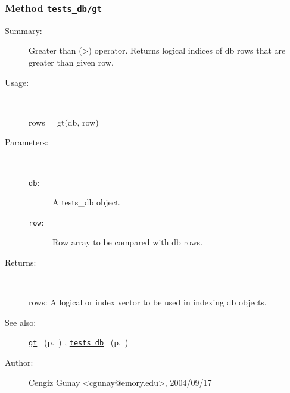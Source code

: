 \subsubsection[Method \texttt{gt}]{Method \texttt{tests\_db/gt}}%
%
\label{ref_tests_db__gt}%
\hypertarget{ref_tests_db__gt}{}%
\begin{description}
\item[Summary:]Greater than (>) operator. Returns logical indices of db rows 
	that are greater than given row.
%
\item[Usage:]~%
\begin{lyxcode}%
rows = gt(db, row)
%
\end{lyxcode}%
%
%
\item[Parameters:]~
\begin{description}%
\item[\texttt{db}:]
 A tests\_db object.
\item[\texttt{row}:]
 Row array to be compared with db rows.
\end{description}%
%
\item[Returns:]~

	rows: A logical or index vector to be used in indexing db objects. 
%
%
\item[See also:]%
\hyperlink{ref_gt}{\texttt{gt}}%
\ (p.~\pageref{ref_gt})%
%
, \hyperlink{ref_tests_db}{\texttt{tests\_db}}%
\ (p.~\pageref{ref_tests_db})%
%
%
\item[Author:]%
Cengiz Gunay <cgunay@emory.edu>, 2004/09/17%
\end{description}
\methodline%
